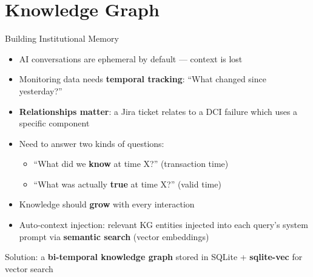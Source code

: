 \documentclass[aspectratio=169,10pt]{beamer}
\begin{document}
\section{Knowledge Graph}

\begin{frame}{Building Institutional Memory}
\begin{itemize}
  \item AI conversations are \alert{ephemeral by default} --- context is lost
  \item Monitoring data needs \textbf{temporal tracking}: ``What changed since yesterday?''
  \item \textbf{Relationships matter}: a Jira ticket relates to a DCI failure which uses a specific component
  \item Need to answer two kinds of questions:
  \begin{itemize}
    \item ``What did we \textbf{know} at time X?'' \quad (transaction time)
    \item ``What was actually \textbf{true} at time X?'' \quad (valid time)
  \end{itemize}
  \item Knowledge should \textbf{grow} with every interaction
  \item \alert{Auto-context injection}: relevant KG entities injected into each query's system prompt via \textbf{semantic search} (vector embeddings)
\end{itemize}

\vfill
\centering
\small\color{gray} Solution: a \textbf{bi-temporal knowledge graph} stored in SQLite + \textbf{sqlite-vec} for vector search
\end{frame}
\end{document}
